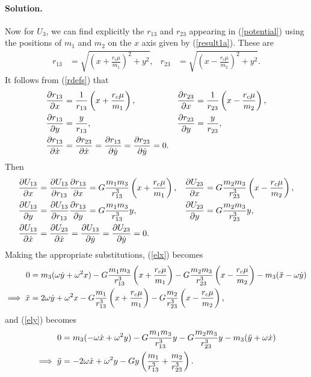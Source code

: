 \documentclass[11pt]{article}
\newcommand{\refeq}[1]{(\ref{#1})}
\newenvironment{solution}
{
    \paragraph{Solution.}
    \ignorespaces
}
{
    \bigskip
}
\begin{document}
\begin{solution}
	Now for $U_3$, we can find explicitly the $r_{13}$ and $r_{23}$ appearing in \refeq{potential} using the positions of $m_1$ and $m_2$ on the $x$ axis given by \refeq{result1a}.  These are
	\begin{align} \label{rdefs}
		r_{13} &= \sqrt{\left( x + \frac{r_c \mu}{m_1} \right)^2 + y^2}, &
		r_{23} &= \sqrt{\left( x - \frac{r_c \mu}{m_2} \right)^2 + y^2}.
	\end{align}
	It follows from \refeq{rdefs} that
	\begin{align}
		\pdv{r_{13}}{x} &= \frac{1}{r_{13}} \left( x + \frac{r_c \mu}{m_1} \right), &
		\pdv{r_{23}}{x} &= \frac{1}{r_{23}} \left( x - \frac{r_c \mu}{m_2} \right), \\
		\pdv{r_{13}}{y} &= \frac{y}{r_{13}},
		& \pdv{r_{23}}{y} &= \frac{y}{r_{23}}, \\
		\pdv{r_{13}}{\dot{x}} &= \pdv{r_{23}}{\dot{x}} = \pdv{r_{13}}{\dot{y}} = \pdv{r_{23}}{\dot{y}} = 0.
	\end{align}
	Then
	\begin{align}
		\pdv{U_{13}}{x} &= \pdv{U_{13}}{r_{13}} \pdv{r_{13}}{x} = G \frac{m_1 m_3}{r_{13}^3} \left( x + \frac{r_c \mu}{m_1} \right), & 
		\pdv{U_{23}}{x} &= G \frac{m_2 m_3}{r_{23}^3} \left( x - \frac{r_c \mu}{m_2} \right), \\
		\pdv{U_{13}}{y} &= \pdv{U_{13}}{r_{13}} \pdv{r_{13}}{y} = G \frac{m_1 m_3}{r_{13}^3} y, &
		\pdv{U_{23}}{y} &= G \frac{m_2 m_3}{r_{23}^3} y, \\
		\pdv{U_{13}}{\dot{x}} &= \pdv{U_{23}}{\dot{x}} = \pdv{U_{13}}{\dot{y}} = \pdv{U_{23}}{\dot{y}} = 0.
	\end{align}
	Making the appropriate substitutions, \refeq{elx} becomes
	\begin{align}
		0 &= m_3 (\omega \dot{y} + \omega^2 x) - G \frac{m_1 m_3}{r_{13}^3} \left( x + \frac{r_c \mu}{m_1} \right) - G \frac{m_2 m_3}{r_{23}^3} \left( x - \frac{r_c \mu}{m_2} \right) - m_3 (\ddot{x} - \omega \dot{y}) \\
		\implies \ddot{x} &= 2 \omega \dot{y} + \omega^2 x - G \frac{m_1}{r_{13}^3} \left( x + \frac{r_c \mu}{m_1} \right) - G \frac{m_2}{r_{23}^3} \left( x - \frac{r_c \mu}{m_2} \right), \label{motionx}
	\end{align}
	and \refeq{ely} becomes
	\begin{align}
		0 &= m_3 (-\omega \dot{x} + \omega^2 y) - G \frac{m_1 m_3}{r_{13}^3} y - G \frac{m_2 m_3}{r_{23}^3} y - m_3 (\ddot{y} + \omega \dot{x}) \\
		\implies \ddot{y} &= -2 \omega \dot{x} + \omega^2 y - G y \left( \frac{m_1}{r_{13}^3} + \frac{m_2}{r_{23}^3} \right). \label{motiony}
	\end{align}


\end{solution}
\end{document}
